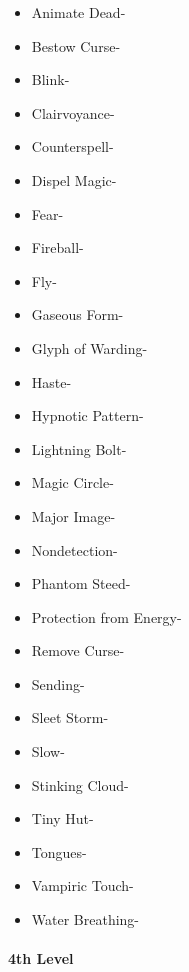 \documentclass[
]{article}
\providecommand{\tightlist}{%
  \setlength{\itemsep}{0pt}\setlength{\parskip}{0pt}}
\begin{document}
\begin{itemize}
\tightlist
\item
  Animate Dead-
\item
  Bestow Curse-
\item
  Blink-
\item
  Clairvoyance-
\item
  Counterspell-
\item
  Dispel Magic-
\item
  Fear-
\item
  Fireball-
\item
  Fly-
\item
  Gaseous Form-
\item
  Glyph of Warding-
\item
  Haste-
\item
  Hypnotic Pattern-
\item
  Lightning Bolt-
\item
  Magic Circle-
\item
  Major Image-
\item
  Nondetection-
\item
  Phantom Steed-
\item
  Protection from Energy-
\item
  Remove Curse-
\item
  Sending-
\item
  Sleet Storm-
\item
  Slow-
\item
  Stinking Cloud-
\item
  Tiny Hut-
\item
  Tongues-
\item
  Vampiric Touch-
\item
  Water Breathing-
\end{itemize}

\hypertarget{4th-level-7}{%
\paragraph{4th Level}\label{4th-level-7}}
\end{document}

